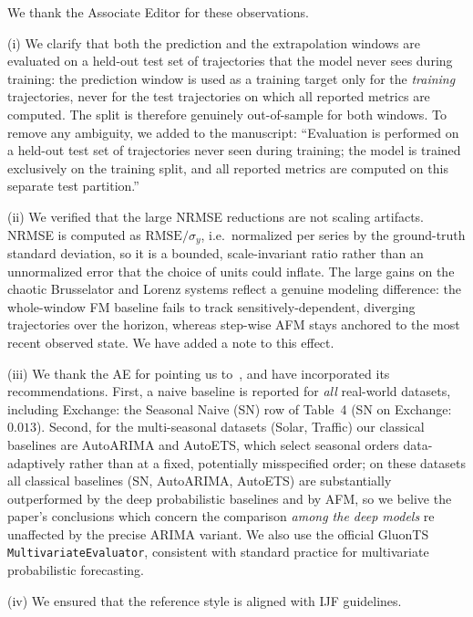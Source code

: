\documentclass[11pt]{article}
\newcommand{\authorresponse}[1]{%
    #1\par\medskip
}
\begin{document}
\authorresponse{%
We thank the Associate Editor for these observations.

(i) We clarify that both the prediction and the extrapolation windows are evaluated on a held-out test set of trajectories that the model never sees during training: the prediction window is used as a training target only for the \emph{training} trajectories, never for the test trajectories on which all reported metrics are computed. The split is therefore genuinely out-of-sample for both windows. To remove any ambiguity, we added to the manuscript: ``Evaluation is performed on a held-out test set of trajectories never seen during training; the model is trained exclusively on the training split, and all reported metrics are computed on this separate test partition.''

(ii) We verified that the large NRMSE reductions are not scaling artifacts. NRMSE is computed as $\text{RMSE}/\sigma_y$, i.e.\ normalized per series by the ground-truth standard deviation, so it is a bounded, scale-invariant ratio rather than an unnormalized error that the choice of units could inflate. The large gains on the chaotic Brusselator and Lorenz systems reflect a genuine modeling difference: the whole-window FM baseline fails to track sensitively-dependent, diverging trajectories over the horizon, whereas step-wise AFM stays anchored to the most recent observed state. We have added a note to this effect.

(iii) We thank the AE for pointing us to~\cite{hewamalage2023forecast}, and have incorporated its recommendations. First, a naive baseline is reported for \emph{all} real-world datasets, including Exchange: the Seasonal Naive (SN) row of Table~4 (SN on Exchange: $0.013$). Second, for the multi-seasonal datasets (Solar, Traffic) our classical baselines are AutoARIMA and AutoETS, which select seasonal orders data-adaptively rather than at a fixed, potentially misspecified order; on these datasets all classical baselines (SN, AutoARIMA, AutoETS) are substantially outperformed by the deep probabilistic baselines and by AFM, so we belive the paper's conclusions which concern the comparison \emph{among the deep models} re unaffected by the precise ARIMA variant. We also use the official GluonTS \texttt{MultivariateEvaluator}, consistent with standard practice for multivariate probabilistic forecasting.

(iv) We ensured that the reference style is aligned with IJF guidelines.

}
\end{document}
